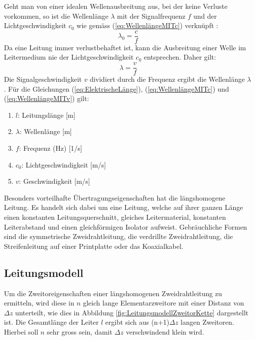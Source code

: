 Geht man von einer idealen Wellenausbreitung aus, bei der keine Verluste vorkommen, so ist die Wellenlänge $\lambda$ mit der Signalfrequenz $f$ und der Lichtgeschwindigkeit $c_0$ wie gemäss (\ref{eq:WellenlängeMITc}) verknüpft \cite{Tekom}:
\begin{equation}
\lambda_{0}=\dfrac{c}{f}\label{eq:WellenlängeMITc}
\end{equation}
Da eine Leitung immer verlustbehaftet ist, kann die Ausbreitung einer Welle im Leitermedium nie der Lichtgeschwindigkeit $c_0$ entsprechen. Daher gilt:
\begin{equation}
\lambda=\dfrac{v}{f}\label{eq:WellenlängeMITv}
\end{equation}
Die Signalgeschwindigkeit $v$ dividiert durch die Frequenz ergibt die Wellenlänge $\lambda$. Für die Gleichungen (\ref{eq:ElektrischeLänge}), (\ref{eq:WellenlängeMITc}) und (\ref{eq:WellenlängeMITv}) gilt:
\begin{enumerate}[leftmargin=2cm]
   \item[] $l$: Leitungslänge [m] 
   \item[] $\lambda$: Wellenlänge  [m] 
   \item[] $f$: Frequenz (Hz) [1/s] 
   \item[] $c_0$: Lichtgeschwindigkeit  [m/s] 
   \item[] $v$: Geschwindigkeit  [m/s] 
\end{enumerate} 
Besonders vorteilhafte Übertragungseigenschaften hat die längshomogene Leitung. Es handelt sich dabei um eine Leitung, welche auf ihrer ganzen Länge einen konstanten Leitungsquerschnitt, gleiches
Leitermaterial, konstanten Leiterabstand und einen gleichförmigen Isolator aufweist. Gebräuchliche Formen sind die symmetrische Zweidrahtleitung, die verdrillte Zweidrahtleitung, die Streifenleitung auf einer Printplatte oder das Koaxialkabel.
\subsection{Leitungsmodell}
Um die Zweitoreigenschaften einer längshomogenen Zweidrahtleitung zu ermitteln, wird diese in $n$ gleich lange Elementarzweitore mit einer Distanz von $\Delta z$ unterteilt, wie dies in Abbildung \ref{fig:LeitungsmodellZweitorKette} dargestellt ist. Die Gesamtlänge der Leiter $l$ ergibt sich aus (n+1)$\Delta z$ langen Zweitoren. Hierbei soll $n$ sehr gross sein, damit $\Delta z$ verschwindend klein wird.


